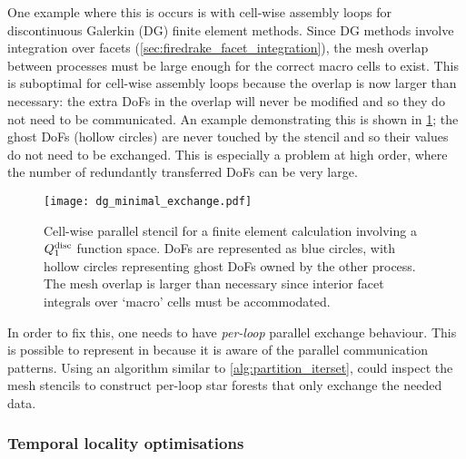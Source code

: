 \documentclass[thesis]{subfiles}
\begin{document}
One example where this is occurs is with cell-wise assembly loops for discontinuous Galerkin (DG) finite element methods.
Since DG methods involve integration over facets (\cref{sec:firedrake_facet_integration}), the mesh overlap between processes must be large enough for the correct macro cells to exist.
This is suboptimal for cell-wise assembly loops because the overlap is now larger than necessary: the extra DoFs in the overlap will never be modified and so they do not need to be communicated.
An example demonstrating this is shown in \cref{fig:dg_minimal_exchange}; the ghost DoFs (hollow circles) are never touched by the stencil and so their values do not need to be exchanged.
This is especially a problem at high order, where the number of redundantly transferred DoFs can be very large.

\begin{figure}
  \centering
  \texttt{[image: dg\_minimal\_exchange.pdf]}
  \caption{
    Cell-wise parallel stencil for a finite element calculation involving a $Q_1^{\textnormal{disc}}$ function space.
    DoFs are represented as blue circles, with hollow circles representing ghost DoFs owned by the other process.
    The mesh overlap is larger than necessary since interior facet integrals over `macro' cells must be accommodated.
  }
  \label{fig:dg_minimal_exchange}
\end{figure}

In order to fix this, one needs to have \emph{per-loop} parallel exchange behaviour.
This is possible to represent in  because it is aware of the parallel communication patterns.
Using an algorithm similar to \cref{alg:partition_iterset},  could inspect the mesh stencils to construct per-loop star forests that only exchange the needed data.

\subsubsection{Temporal locality optimisations}
\end{document}
